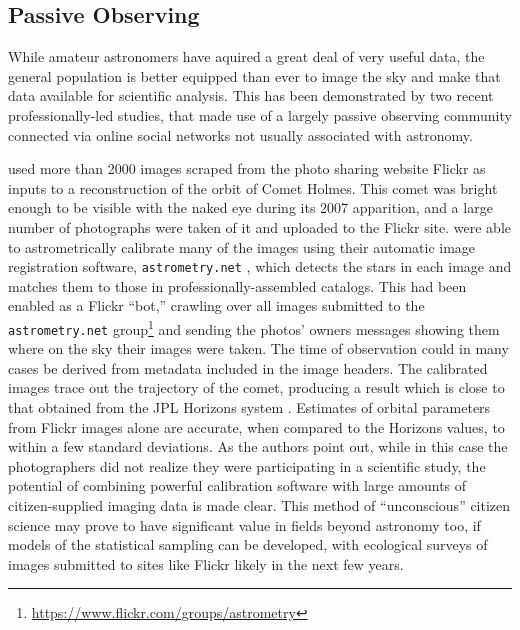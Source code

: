 \documentclass{ar2e}
\begin{document}

 

\subsection{Passive Observing}
\label{sec:obs:passive}

While amateur astronomers have aquired a great deal of very useful data, the
general population is better equipped than ever to image the sky and make that
data available for scientific analysis. This has been demonstrated by two
recent professionally-led studies, that made use of a largely passive
observing community connected via online social networks not usually
associated with astronomy. 


\citet{Lang++2012} used more than 2000 images scraped from the photo sharing
website Flickr as inputs to a reconstruction of the orbit of Comet Holmes. This
comet was bright enough to be visible with the naked eye during its 2007
apparition, and a large number of photographs were taken of it and uploaded to
the Flickr site. \citeauthor{Lang++2012} were able to astrometrically calibrate
many of the images using their automatic image registration software,
\texttt{astrometry.net} \citep{Lang++2010}, which detects the stars in each image and matches them
to those in professionally-assembled catalogs. This had been enabled as a Flickr
``bot,'' crawling over all images submitted to the \texttt{astrometry.net}
group\footnote{\url{https://www.flickr.com/groups/astrometry}} and sending the
photos' owners messages showing them where on the sky their images were taken. 
The time of observation could in many cases be derived from metadata included in
the image headers. The calibrated images trace out the trajectory of the comet,
producing a result which is close to that obtained from the JPL Horizons system
\citep{Giorgini}. Estimates of orbital parameters from Flickr images alone are
accurate, when compared to the Horizons values, to within a few standard
deviations. As the authors point out, while in this case the photographers did
not realize they were participating in a scientific study, the potential of
combining powerful calibration software with large amounts of citizen-supplied
imaging data is made clear. This method of ``unconscious'' citizen science may
prove to have significant value in fields beyond astronomy too, if models of the
statistical sampling can be developed, with ecological surveys of images
submitted to sites like Flickr likely in the next few years. 
\end{document}

